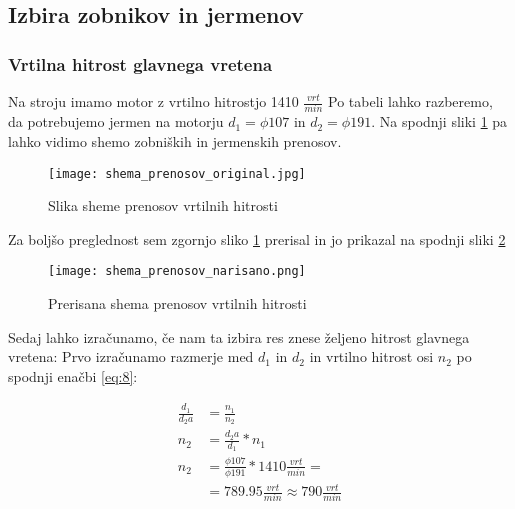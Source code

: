 \subsection{Izbira zobnikov in jermenov}
\subsubsection{Vrtilna hitrost glavnega vretena}
Na stroju imamo motor z vrtilno hitrostjo 1410 \( \frac{vrt}{min} \)
Po tabeli  lahko razberemo, da potrebujemo jermen na motorju
\( d_1 = \phi 107 \) in \( d_2 = \phi 191 \).
Na spodnji sliki \ref{slika_prenosov} pa lahko vidimo shemo
zobniških in jermenskih prenosov.

\begin{figure}[H]
    \begin{center}
        \texttt{[image: shema\_prenosov\_original.jpg]}
        \caption{Slika sheme prenosov vrtilnih hitrosti 
        \cite{gauthier}}
        \label{slika_prenosov}
    \end{center}
\end{figure}

Za boljšo preglednost sem zgornjo sliko \ref{slika_prenosov}
prerisal in jo prikazal na spodnji sliki \ref{skica_prenosov}

\begin{figure}[H]
    \begin{center}
        \texttt{[image: shema\_prenosov\_narisano.png]}
        \caption{Prerisana shema prenosov vrtilnih hitrosti 
        \cite{lasten}}
        \label{skica_prenosov}
    \end{center}
\end{figure}

Sedaj lahko izračunamo, če nam ta izbira res znese željeno hitrost glavnega vretena:
Prvo izračunamo razmerje med \( d_1 \) in \( d_2 \) in vrtilno hitrost osi \(n_2\)
po spodnji enačbi \ref{eq:8}:

\begin{equation}
    \label{eq:8}
    \begin{split}
        \frac{d_1}{d_2a} &= \frac{n_1}{n_2} \\
        n_2 &= \frac{d_2a}{d_1} * n_1 \\
        n_2 &= \frac{\phi 107}{\phi 191} * 1410 \frac{vrt}{min} = \\
            &= 789.95 \frac{vrt}{min} \approx 790 \frac{vrt}{min}
    \end{split}
\end{equation}

